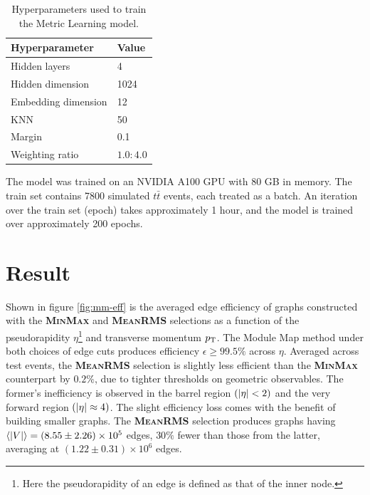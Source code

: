 \begin{table}[h!]
    \centering
    \begin{tabular}{l|l}
    \hline
      Hyperparameter   &  Value \\ \hline 
       Hidden layers   & 4\\
       Hidden dimension& 1024 \\
       Embedding dimension & 12 \\
       KNN & 50 \\
       Margin & 0.1 \\
       Weighting ratio & $1.0:4.0$ \\
    \hline
    \end{tabular}
    \caption{Hyperparameters used to train the Metric Learning model.}
    \label{tab:metric-learning-specification}
\end{table}

\newpage


The model was trained on an NVIDIA A100 GPU with 80 GB in memory. 
The train set contains 7800 simulated $t\bar{t}$ events, each treated as a batch. 
An iteration over the train set (epoch) takes approximately 1 hour, and the model is trained over approximately 200 epochs. 

\section{Result}
\label{sect:graph-contruction-performance}

Shown in figure \ref{fig:mm-eff} is the averaged edge efficiency of graphs constructed with the \textbf{\textsc{MinMax}} and \textbf{\textsc{MeanRMS}} selections as a function of the pseudorapidity $\eta$\footnote{Here the pseudorapidity of an edge is defined as that of the inner node.} and transverse momentum $p_{\text{T}}$. 
The Module Map method under both choices of edge cuts produces efficiency $\epsilon\ge 99.5\%$ across $\eta$. 
Averaged across test events, the \textbf{\textsc{MeanRMS}} selection is slightly less efficient than the \textbf{\textsc{MinMax}} counterpart by $0.2\%$, due to tighter thresholds on geometric observables. 
The former's inefficiency is observed in the barrel region $(\abs{\eta}<2)$ and the very forward region $(\abs{\eta} \approx 4)$.
The slight efficiency loss comes with the benefit of building smaller graphs.
The \textbf{\textsc{MeanRMS}} selection produces graphs having $\expval{|V|} = (8.55\pm2.26)\times10^5$ edges, $30\%$ fewer than those from the latter, averaging at $(1.22\pm0.31)\times10^6$ edges.

